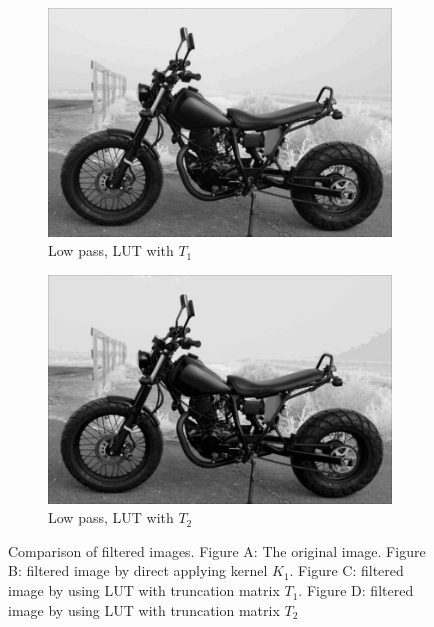 \documentclass[12pt]{amsart}
\theoremstyle{definition}
\theoremstyle{remark}
\numberwithin{thm}{section}
\begin{document}
\begin{figure}[h]
\begin{subfigure}[b]{0.4\textwidth} \includegraphics[width=\textwidth]{motor_lut_212.png} \caption{Low pass, LUT with $T_1$} %
\end{subfigure}
\begin{subfigure}[b]{0.4\textwidth} \includegraphics[width=\textwidth]{motor_lut_424.png} \caption{Low pass, LUT with $T_2$} \end{subfigure}
\caption{Comparison of filtered images. Figure A: The original image. Figure B: filtered image by direct applying kernel $K_1$. Figure C: filtered image by using LUT with truncation matrix $T_1$. Figure D: filtered image by using LUT with truncation matrix $T_2$}
\label{fig:motor} 
\end{figure}
\end{document}
